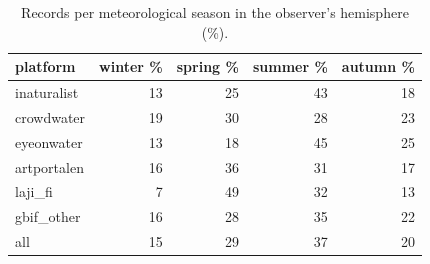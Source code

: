 \begin{table}[htbp]
\centering
\small
\caption{Records per meteorological season in the observer's hemisphere (\%).}
\label{tab:seasons}
\begin{tabular}{lrrrr}
\toprule
platform & winter \% & spring \% & summer \% & autumn \% \\
\midrule
inaturalist & 13 & 25 & 43 & 18 \\
crowdwater & 19 & 30 & 28 & 23 \\
eyeonwater & 13 & 18 & 45 & 25 \\
artportalen & 16 & 36 & 31 & 17 \\
laji\_fi & 7 & 49 & 32 & 13 \\
gbif\_other & 16 & 28 & 35 & 22 \\
all & 15 & 29 & 37 & 20 \\
\bottomrule
\end{tabular}
\end{table}
